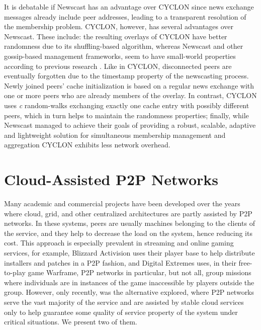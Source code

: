 \documentclass[runningheads]{llncs}
\begin{document}
It is debatable if Newscast has an advantage over CYCLON since news exchange messages already include peer addresses, leading to a transparent resolution of the membership problem. CYCLON, however, has several advantages over Newscast. These include: the resulting overlays of CYCLON have better randomness due to its shuffling-based algorithm, whereas Newscast and other gossip-based management frameworks, seem to have small-world properties according to previous research \cite{eval-gossip-based}. Like in CYCLON, disconnected peers are eventually forgotten due to the timestamp property of the newscasting process. Newly joined peers' cache initialization is based on a regular news exchange with one or more peers who are already members of the overlay. In contrast, CYCLON uses \textit{c} random-walks exchanging exactly one cache entry with possibly different peers, which in turn helps to maintain the randomness properties; finally, while Newscast managed to achieve their goals of providing a robust, scalable, adaptive and lightweight solution for simultaneous membership management and aggregation CYCLON exhibits less network overhead\cite{cyclon}.

\section{Cloud-Assisted P2P Networks}

Many academic and commercial projects have been developed over the years where cloud, grid, and other centralized architectures are partly assisted by P2P networks. In these systems, peers are usually machines belonging to the clients of the service, and they help to decrease the load on the system, hence reducing its cost. This approach is especially prevalent in streaming and online gaming services, for example, Blizzard Activision uses their player base to help distribute installers and patches in a P2P fashion, and Digital Extremes uses, in their free-to-play game Warframe, P2P networks in particular, but not all, group missions where individuals are in instances of the game inaccessible by players outside the group. However, only recently, was the alternative explored, where P2P networks serve the vast majority of the service and are assisted by stable cloud services only to help guarantee some quality of service property of the system under critical situations. We present two of them.
\end{document}
